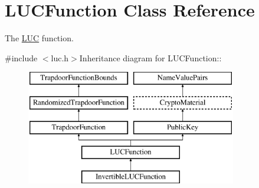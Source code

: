 \hypertarget{class_l_u_c_function}{
\section{LUCFunction Class Reference}
\label{class_l_u_c_function}
}


The \hyperlink{struct_l_u_c}{LUC} function.  


{\ttfamily \#include $<$luc.h$>$}Inheritance diagram for LUCFunction::\begin{figure}[H]
\begin{center}
\leavevmode
\includegraphics[height=5cm]{class_l_u_c_function}
\end{center}
\end{figure}

